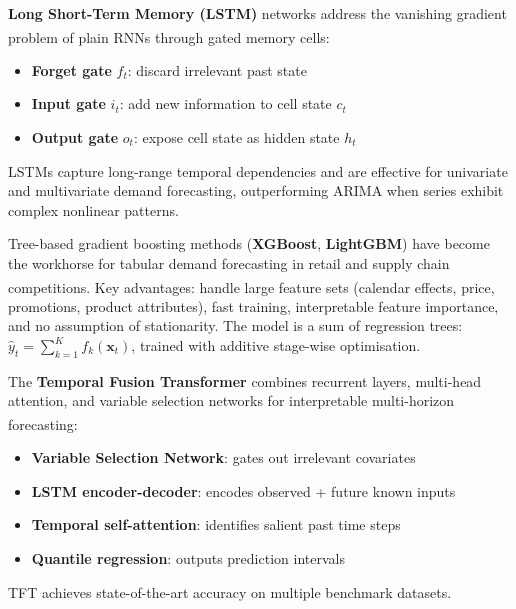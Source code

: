 \begin{tcbitemize}[ skin=sectionraster ]

    \tcbitem[title=LSTMs for Time Series, raster multicolumn=3]
    \textbf{Long Short-Term Memory (LSTM)} networks address the vanishing gradient problem of plain RNNs through gated memory cells\textsuperscript{\cite[][pp.~1748--1751]{limTemporalFusionTransformers2021}}:
    \begin{itemize}
        \item \textbf{Forget gate} $f_t$: discard irrelevant past state
        \item \textbf{Input gate} $i_t$: add new information to cell state $c_t$
        \item \textbf{Output gate} $o_t$: expose cell state as hidden state $h_t$
    \end{itemize}
    LSTMs capture long-range temporal dependencies and are effective for univariate and multivariate demand forecasting, outperforming ARIMA when series exhibit complex nonlinear patterns.

    \tcbitem[title=Gradient Boosting for Forecasting, raster multicolumn=3]
    Tree-based gradient boosting methods (\textbf{XGBoost}, \textbf{LightGBM}) have become the workhorse for tabular demand forecasting in retail and supply chain competitions\textsuperscript{\cite[][p.~905]{huberDataDrivenNewsvendor2019}}.
    Key advantages: handle large feature sets (calendar effects, price, promotions, product attributes), fast training, interpretable feature importance, and no assumption of stationarity.
    The model is a sum of regression trees: $\hat{y}_t = \sum_{k=1}^K f_k(\mathbf{x}_t)$, trained with additive stage-wise optimisation.

    \tcbitem[title=Temporal Fusion Transformer (TFT), raster multicolumn=3]
    The \textbf{Temporal Fusion Transformer} combines recurrent layers, multi-head attention, and variable selection networks for interpretable multi-horizon forecasting\textsuperscript{\cite[][pp.~1748--1764]{limTemporalFusionTransformers2021}}:
    \begin{itemize}
        \item \textbf{Variable Selection Network}: gates out irrelevant covariates
        \item \textbf{LSTM encoder-decoder}: encodes observed + future known inputs
        \item \textbf{Temporal self-attention}: identifies salient past time steps
        \item \textbf{Quantile regression}: outputs prediction intervals
    \end{itemize}
    TFT achieves state-of-the-art accuracy on multiple benchmark datasets.


\end{tcbitemize}
